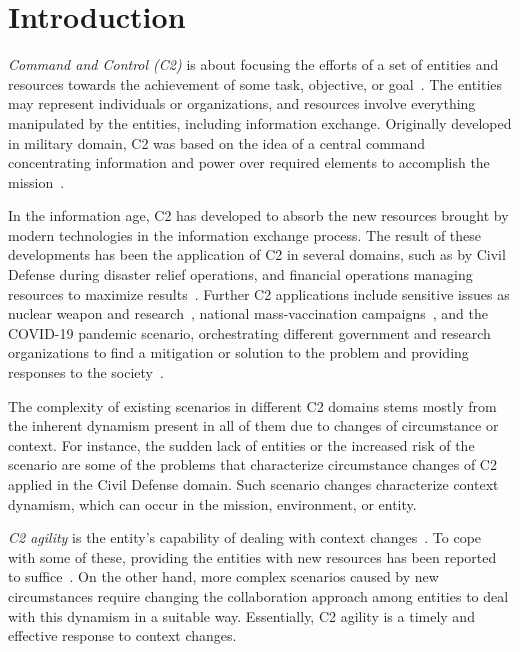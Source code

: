 \section{Introduction}
\label{sec:introduction}

\textit{Command and Control (C2)} is about focusing the efforts of a set of entities and resources towards the achievement of some task, objective, or goal~\citep{CC02}. The entities may represent individuals or organizations, and resources involve everything manipulated by the entities, including information exchange. Originally developed in military domain, C2 was based on the idea of a central command concentrating information and power over required elements to accomplish the mission~\citep{CC01}.

In the information age, C2 has developed to absorb the new resources brought by modern technologies in the information exchange process. The result of these developments has been the application of C2 in several domains, such as by Civil Defense during disaster relief operations, and financial operations managing resources to maximize results~\citep{CC03,CC04}. Further C2 applications include sensitive issues as nuclear weapon and research~\citep{C2-EX2}, national mass-vaccination campaigns~\citep{C2-EX1}, and the COVID-19 pandemic scenario, orchestrating different government and research organizations to find a mitigation or solution to the problem and providing responses to the society~\citep{C2-EX3, C2-EX4, C2-EX5}.

The complexity of existing scenarios in different C2 domains stems mostly from the inherent dynamism present in all of them due to changes of circumstance or context. For instance, the sudden lack of entities or the increased risk of the scenario are some of the problems that characterize circumstance changes of C2 applied in the Civil Defense domain. Such scenario changes characterize context dynamism, which can occur in the mission, environment, or entity.

\textit{C2 agility} is the entity's capability of dealing with context changes~\citep{france2014}. To cope with some of these, providing the entities with new resources has been reported to suffice~\citep{france2014}. On the other hand, more complex scenarios caused by new circumstances require changing the collaboration approach among entities to deal with this dynamism in a suitable way. Essentially, C2 agility is a timely and effective response to context changes.

